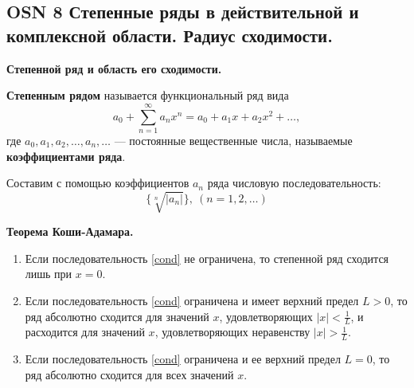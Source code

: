 \subsection{OSN 8 Степенные ряды в действительной и комплексной области. Радиус сходимости.}

\textbf{Степенной ряд и область его сходимости.}

\textbf{Степенным рядом} называется функциональный ряд вида
$$ a_0 + \displaystyle\sum_{n=1}^{\infty}a_n x^n =a_0 +a_1 x+a_2 x^2 +\dots,$$
где $a_0, a_1, a_2,\dots, a_n,\dots$ --- постоянные вещественные числа, называемые \textbf{коэффициентами ряда}.

Составим с помощью коэффициентов $a_n$ ряда числовую последовательность:
\begin{equation}
    \{\sqrt[n]{|a_n|}\},~(n = 1,2,\dots)
    \label{cond}
\end{equation}

\textbf{Теорема Коши-Адамара.}
\begin{enumerate}
    \item Если последовательность \ref{cond} не ограничена, то степенной ряд сходится лишь при $x = 0$.
    \item Если последовательность \ref{cond} ограничена и имеет верхний предел $L > 0$, то ряд абсолютно сходится для значений $x$, удовлетворяющих $|x| < \frac{1}{L}$, и расходится для значений $x$, удовлетворяющих неравенству $|x| > \frac{1}{L}$.
    \item Если последовательность \ref{cond} ограничена и ее верхний предел $L = 0$, то ряд абсолютно сходится для всех значений $x$.
\end{enumerate}


